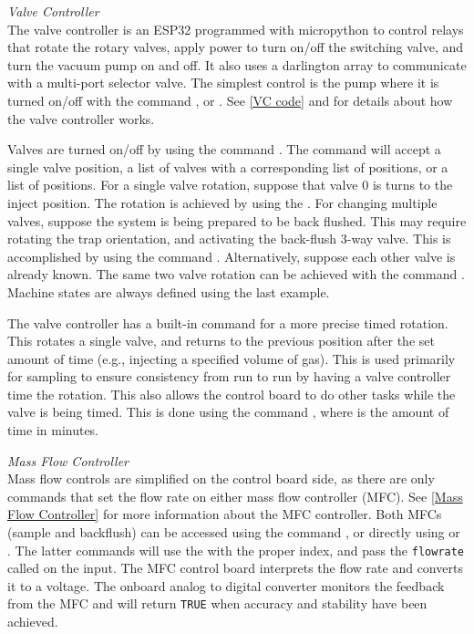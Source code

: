 \emph{Valve Controller}\\
The valve controller is an ESP32 programmed with micropython to control relays that rotate the rotary valves, apply power to turn on/off the switching valve, and turn the vacuum pump on and off. It also uses a darlington array to communicate with a multi-port selector valve. The simplest control is the pump where it is turned on/off with the command , or . See \ref{VC code} and  for details about how the valve controller works.

Valves are turned on/off by using the command . The command will accept a single valve position, a list of valves with a corresponding list of positions, or a list of positions. For a single valve rotation, suppose that valve 0 is turns to the inject position. The rotation is achieved by using the . For changing multiple valves, suppose the system is being prepared to be back flushed. This may require rotating the trap orientation, and activating the back-flush 3-way valve. This is accomplished by using the command . Alternatively, suppose each other valve is already known. The same two valve rotation can be achieved with the command . Machine states are always defined using the last example.

The valve controller has a built-in command for a more precise timed rotation. This rotates a single valve, and returns to the previous position after the set amount of time (e.g., injecting a specified volume of gas). This is used primarily for sampling to ensure consistency from run to run by having a valve controller time the rotation. This also allows the control board to do other tasks while the valve is being timed. This is done using the command , where  is the amount of time in minutes.

\emph{Mass Flow Controller}\\
Mass flow controls are simplified on the control board side, as there are only commands that set the flow rate on either mass flow controller (MFC). See \ref{Mass Flow Controller} for more information about the MFC controller. Both MFCs (sample and backflush) can be accessed using the command , or directly using  or . The latter commands will use the  with the proper index, and pass the \texttt{flowrate} called on the input. The MFC control board interprets the flow rate and converts it to a voltage. The onboard analog to digital converter monitors the feedback from the MFC and will return \texttt{TRUE} when accuracy and stability have been achieved.

